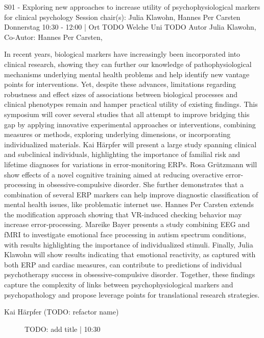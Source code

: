 
\begin{symposium}
{S01 - Exploring new approaches to increase utility of psychophysiological markers for clinical psychology}
{Session chair(s): Julia Klawohn, Hannes Per Carsten}
{Donnerstag 10:30 - 12:00 | Ort TODO}
{Welche Uni TODO}
Autor Julia Klawohn, Co-Autor: Hannes Per Carsten,

In recent years, biological markers have increasingly been incorporated into clinical research, showing they can further our knowledge of pathophysiological mechanisms underlying mental health problems and help identify new vantage points for interventions. Yet, despite these advances, limitations regarding robustness and effect sizes of associations between biological processes and clinical phenotypes remain and hamper practical utility of existing findings. This symposium will cover several studies that all attempt to improve bridging this gap by applying innovative experimental approaches or interventions, combining measures or methods, exploring underlying dimensions, or incorporating individualized materials. Kai Härpfer will present a large study spanning clinical and subclinical individuals, highlighting the importance of familial risk and lifetime diagnoses for variations in error-monitoring ERPs. Rosa Grützmann will show effects of a novel cognitive training aimed at reducing overactive error-processing in obsessive-compulsive disorder. She further demonstrates that a combination of several ERP markers can help improve diagnostic classification of mental health issues, like problematic internet use. Hannes Per Carsten extends the modification approach showing that VR-induced checking behavior may increase error-processing. Mareike Bayer presents a study combining EEG and fMRI to investigate emotional face processing in autism spectrum conditions, with results highlighting the importance of individualized stimuli. Finally, Julia Klawohn will show results indicating that emotional reactivity, as captured with both ERP and cardiac measures, can contribute to predictions of individual psychotherapy success in obsessive-compulsive disorder. Together, these findings capture the complexity of links between psychophysiological markers and psychopathology and propose leverage points for translational research strategies.
\begin{description}    

    \item [Kai Härpfer (TODO: refactor name)] TODO: add title \textcolor{mygray}{ | 10:30}    
    

\end{description}
\end{symposium}
